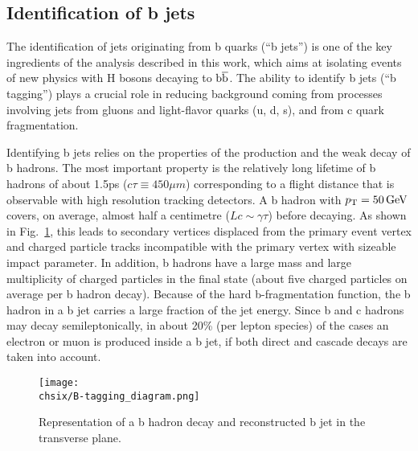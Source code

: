 \subsection{Identification of b jets}\label{subsec:bjets}

The identification of jets originating from b quarks (``b jets'') is one of the key ingredients of the analysis described in this work, which aims at isolating events of new physics with H bosons decaying to ${\mathrm{b}\overline{\mathrm{b}}}$. The ability to identify b jets (``b tagging'') plays a crucial role in reducing background coming from processes involving jets from gluons and light-flavor quarks (u, d, s), and from c quark fragmentation.

Identifying b jets relies on the properties of the production and the weak decay of b hadrons. The most important property is the relatively long lifetime of b hadrons of about 1.5\unit{ps} ($c\tau \equiv 450\mu m$) corresponding to a flight distance that is observable with high resolution tracking detectors. A b hadron with $p_{\mathrm{T}} = 50\,\text{Ge\hspace{-.08em}V}$ covers, on average, almost half a centimetre ($Lc \sim \gamma\tau$) before decaying. As shown in Fig.~\ref{fig:bjet}, this leads to secondary vertices displaced from the primary event vertex and charged particle tracks incompatible with the primary vertex with sizeable impact parameter. In addition, b hadrons have a large mass and large multiplicity of charged particles in the final state (about five charged particles on average per b hadron decay). Because of the hard b-fragmentation function, the b hadron in a b jet carries a large fraction of the jet energy. Since b and c hadrons may decay semileptonically, in about 20\% (per lepton species) of the cases an electron or muon is produced inside a b jet, if both direct and cascade decays are taken into account.

\begin{figure}[!htb]
 \begin{center}
  \texttt{[image: \\chsix/B-tagging\_diagram.png]}
 \end{center}
 \caption{Representation of a b hadron decay and reconstructed b jet in the transverse plane.}
 \label{fig:bjet}
\end{figure}

